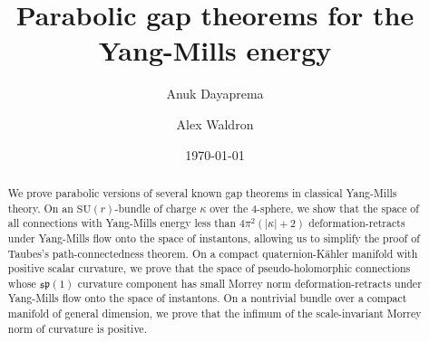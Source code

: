 \documentclass[12pt]{amsart}
\renewcommand{\1}{{\mathbf 1}}
\newcommand{\SU}{{\mathrm{SU} }}
\theoremstyle{others}
\numberwithin{equation}{section}
\begin{document}
\title[Parabolic gap theorems]{Parabolic gap theorems for the Yang-Mills energy}
\author{Anuk Dayaprema}
\address{University of Wisconsin, Madison}
\author{Alex Waldron}
\address{University of Wisconsin, Madison}
\date{\today}



\begin{abstract}
    We prove parabolic versions of several known gap theorems in classical Yang-Mills theory. %
    On an $\SU(r)$-bundle of charge $\kappa$ over the 4-sphere, we show that the space of all connections with Yang-Mills energy less than $4 \pi^2 \left( |\kappa| + 2 \right)$ deformation-retracts under Yang-Mills flow onto the space of instantons, allowing us to simplify the proof of Taubes's path-connectedness theorem.
    On a compact quaternion-K\"ahler manifold with positive scalar curvature, we prove that the space of pseudo-holomorphic connections whose $\mathfrak{sp}(1)$ curvature component has small Morrey norm deformation-retracts under Yang-Mills flow onto the space of instantons. On a nontrivial bundle over a compact manifold of general dimension, we prove that the infimum of the scale-invariant Morrey norm of curvature is positive.
\end{abstract}

\maketitle

\end{document}

